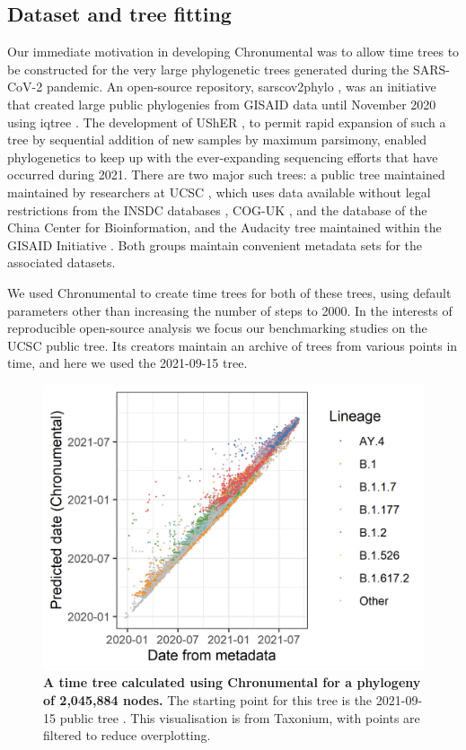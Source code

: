 \subsection*{Dataset and tree fitting}

Our immediate motivation in developing Chronumental was to allow time trees to be constructed for the very large phylogenetic trees generated during the SARS-CoV-2 pandemic. An open-source repository, sarscov2phylo \citep{phylo}, was an initiative that created large public phylogenies from GISAID data until November 2020 using iqtree \citep{Minh2020-vc}. The development of UShER \citep{Turakhia2021-la}, to permit rapid expansion of such a tree by sequential addition of new samples by maximum parsimony, enabled phylogenetics to keep up with the ever-expanding sequencing efforts that have occurred during 2021. There are two major such trees: a public tree maintained maintained by researchers at UCSC \citep{McBroome2021-fn}, which uses data available without legal restrictions from the INSDC databases \citep{Arita2021-dc}, COG-UK \citep{Nicholls2021-fz}, and the database of the China Center for Bioinformation, and the Audacity tree maintained within the GISAID Initiative \citep{gisaid}. Both groups maintain convenient metadata sets for the associated datasets.

We used Chronumental to create time trees for both of these trees, using default parameters other than increasing the number of steps to 2000. In the interests of reproducible open-source analysis we focus our benchmarking studies on the UCSC public tree. Its creators maintain an archive of trees from various points in time, and here we used the 2021-09-15 tree.

\begin{figure}[t]
\centering
\includegraphics[width=1\linewidth]{Figures/anac.png}
\caption{\textbf{A time tree calculated using Chronumental for a phylogeny of 2,045,884 nodes.} The starting point for this tree is the 2021-09-15 public tree \citep{McBroome2021-fn}. This visualisation is from Taxonium, with points are filtered to reduce overplotting.
}
\label{anac}
\end{figure}



